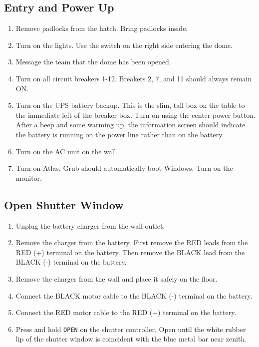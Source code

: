 \documentclass{article}
\begin{document}
	\subsection{Entry and Power Up}
	
	\begin{enumerate}
		
		\item Remove padlocks from the hatch. Bring padlocks inside.
		
		\item Turn on the lights. Use the switch on the right side entering the dome.
		
		\item Message the team that the dome has been opened.
		
		\item Turn on all circuit breakers 1-12. Breakers 2, 7, and 11 should always remain ON.
		
		\item Turn on the UPS battery backup. This is the slim, tall box on the table to the immediate left of the breaker box. Turn on using the center power button. After a beep and some warming up, the information screen should indicate the battery is running on the power line rather than on the battery.
		
		\item Turn on the AC unit on the wall.
		
		\item Turn on Atlas. Grub should automatically boot Windows. Turn on the monitor.
		
	\end{enumerate}
	
	\subsection{Open Shutter Window}
	
	\begin{enumerate}
		
		\item Unplug the battery charger from the wall outlet.
		
		\item Remove the charger from the battery. First remove the RED leads from the RED (+) terminal on the battery. Then remove the BLACK lead from the BLACK (-) terminal on the battery.
		
		\item Remove the charger from the wall and place it safely on the floor.
		
		\item Connect the BLACK motor cable to the BLACK (-) terminal on the battery.
		
		\item Connect the RED motor cable to the RED (+) terminal on the battery.
		
		\item Press and hold \texttt{OPEN} on the shutter controller. Open until the white rubber lip of the shutter window is coincident with the blue metal bar near zenith.
		
	\end{enumerate}
	
\end{document}
